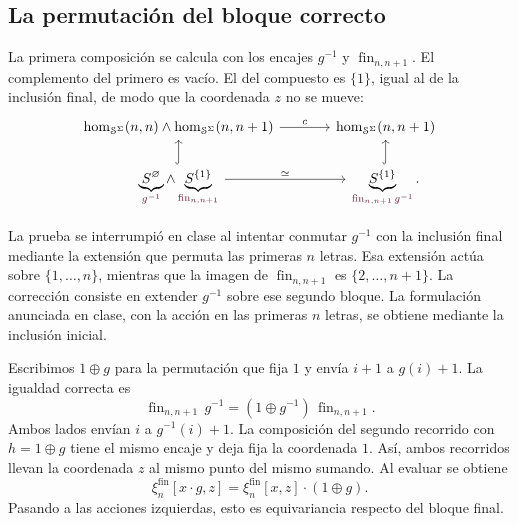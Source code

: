 \subsection{La permutación del bloque correcto}

La primera composición se calcula con los encajes $g^{-1}$ y $\operatorname{fin}_{n,n+1}$. El complemento del primero es vacío. El del compuesto es $\{1\}$, igual al de la inclusión final, de modo que la coordenada $z$ no se mueve:
\[
\begin{tikzcd}[column sep=large,row sep=normal]
\hom_{\mathcal S^\Sigma}(n,n)\wedge\hom_{\mathcal S^\Sigma}(n,n+1)
  \arrow[r,"c"]&
\hom_{\mathcal S^\Sigma}(n,n+1)\\
\underbrace{S^\varnothing}_{\textcolor{rojoCIMAT}{g^{-1}}}\wedge
\underbrace{S^{\{1\}}}_{\textcolor{rojoCIMAT}{\operatorname{fin}_{n,n+1}}}
  \arrow[u,hook]\arrow[r,"\simeq"]&
\underbrace{S^{\{1\}}}_{\textcolor{rojoCIMAT}{\operatorname{fin}_{n,n+1}g^{-1}}}
  \arrow[u,hook].
\end{tikzcd}
\]

\begin{nota}
La prueba se interrumpió en clase al intentar conmutar $g^{-1}$ con la inclusión final mediante la extensión que permuta las primeras $n$ letras. Esa extensión actúa sobre $\{1,\ldots,n\}$, mientras que la imagen de $\operatorname{fin}_{n,n+1}$ es $\{2,\ldots,n+1\}$. La corrección consiste en extender $g^{-1}$ sobre ese segundo bloque. La formulación anunciada en clase, con la acción en las primeras $n$ letras, se obtiene mediante la inclusión inicial.
\end{nota}

Escribimos $1\oplus g$ para la permutación que fija $1$ y envía $i+1$ a $g(i)+1$. La igualdad correcta es
\[
\operatorname{fin}_{n,n+1}\,g^{-1}
=(1\oplus g^{-1})\,\operatorname{fin}_{n,n+1}.
\]
Ambos lados envían $i$ a $g^{-1}(i)+1$. La composición del segundo recorrido con $h=1\oplus g$ tiene el mismo encaje y deja fija la coordenada $1$. Así, ambos recorridos llevan la coordenada $z$ al mismo punto del mismo sumando. Al evaluar se obtiene
\[
\xi_n^{\mathrm{fin}}[x\cdot g,z]
=\xi_n^{\mathrm{fin}}[x,z]\cdot(1\oplus g).
\]
Pasando a las acciones izquierdas, esto es equivariancia respecto del bloque final.

